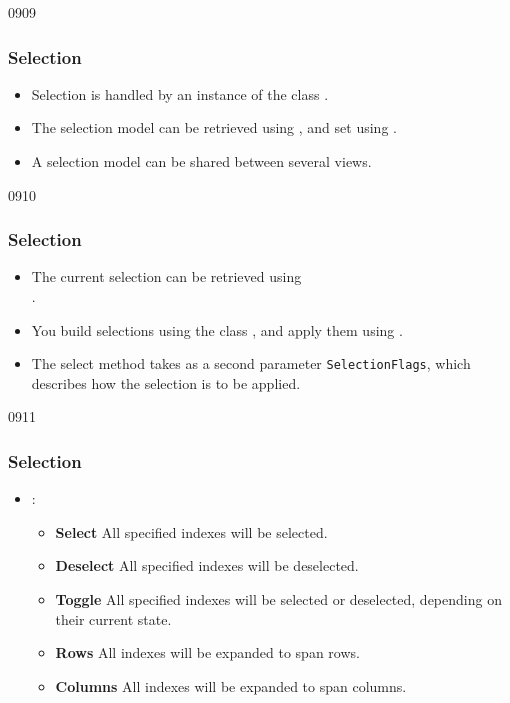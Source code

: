 \begin{slide}{0909}\frametitle{Selection}\label{model_view_selection}
\begin{itemize}
\item Selection is handled by an instance of the class
  .
\item The selection model can be retrieved using
  , and set using
  .
\item A selection model can be shared between several views.
\end{itemize}
\end{slide}

\begin{slide}{0910}\frametitle{Selection}
\begin{itemize}
\item The current selection can be retrieved using\\
  .
\item You build selections using the class , and
  apply them using .
\item The select method takes as a second parameter
  \texttt{SelectionFlags}, which describes how the selection is to be
  applied.
\end{itemize}
\end{slide}

\begin{slide}{0911}\frametitle{Selection}
\begin{itemize}
\item {}:
\begin{itemize}
\item \textbf{Select} All specified indexes will be selected.
\item \textbf{Deselect} All specified indexes will be deselected.
\item \textbf{Toggle} All specified indexes will be selected or deselected, depending on their current state.\\

\item \textbf{Rows} All indexes will be expanded to span rows.
\item \textbf{Columns} All indexes will be expanded to span columns.\\
\end{itemize}
\end{itemize}
\end{slide}


